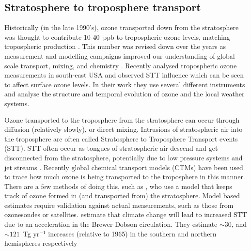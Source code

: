  
  \subsection{Stratosphere to troposphere transport}
    \label{LR:O3:STT}
    Historically (in the late 1990's), ozone transported down from the stratosphere was thought to contribute 10-40~ppb to tropospheric ozone levels, matching tropospheric production \citep{Atkinson2000, Stohl2003}.
    This number was revised down over the years as measurement and modelling campaigns improved our understanding of global scale transport, mixing, and chemistry \citep{Monks2015}.
    Recently \cite{Kuang2017} analysed tropospheric ozone measurements in south-east USA and observed STT influence which can be seen to affect surface ozone levels.
    In their work they use several different instruments and analyse the structure and temporal evolution of ozone and the local weather systems.
    
    Ozone transported to the troposphere from the stratosphere can occur through diffusion (relatively slowly), or direct mixing.
    Intrusions of stratospheric air into the troposphere are often called Stratosphere to Troposphere Transport events (STT).
    STT often occur as tongues of stratospheric air descend and get disconnected from the stratosphere, potentially due to low pressure systems and jet streams \cite{Sprenger2003}.
    Recently global chemical transport models (CTMs) have been used to trace how much ozone is being transported to the troposphere in this manner.
    There are a few methods of doing this, such as \cite{Ojha2016}, who use a model that keeps track of ozone formed in (and transported from) the stratosphere.
    Model based estimates require validation against actual measurements, such as those from ozonesondes or satellites.
    \cite{Hegglin2009} estimate that climate change will lead to increased STT due to an acceleration in the Brewer Dobson circulation.
    They estimate $\sim 30$, and $\sim 121$~Tg yr$^{-1}$ increases (relative to 1965) in the southern and northern hemispheres respectively
    
